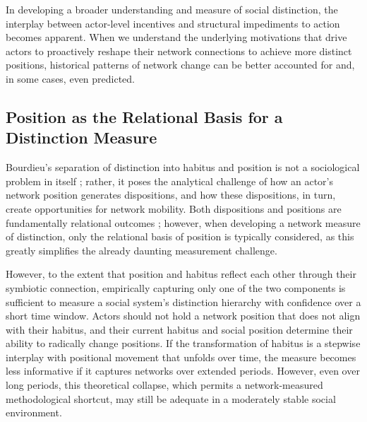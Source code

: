 \documentclass[12pt]{article}
\begin{document}
In developing a broader understanding and measure of social distinction, the interplay between actor-level incentives and structural impediments to action becomes apparent. When we understand the underlying motivations that drive actors to proactively reshape their network connections to achieve more distinct positions, historical patterns of network change can be better accounted for and, in some cases, even predicted. 

\subsection{Position as the Relational Basis for a Distinction Measure}
Bourdieu's separation of distinction into habitus and position is not a sociological problem in itself \citep{martin2003field}; rather, it poses the analytical challenge of how an actor's network position generates dispositions, and how these dispositions, in turn, create opportunities for network mobility. Both dispositions and positions are fundamentally relational outcomes \citep{erikson2013formalist-400}; however, when developing a network measure of distinction, only the relational basis of position is typically considered, as this greatly simplifies the already daunting measurement challenge. 

However, to the extent that position and habitus reflect each other through their symbiotic connection, empirically capturing only one of the two components is sufficient to measure a social system's distinction hierarchy with confidence over a short time window. Actors should not hold a network position that does not align with their habitus, and their current habitus and social position determine their ability to radically change positions. If the transformation of habitus is a stepwise interplay with positional movement that unfolds over time, the measure becomes less informative if it captures networks over extended periods. However, even over long periods, this theoretical collapse, which permits a network-measured methodological shortcut, may still be adequate in a moderately stable social environment. 
\end{document}
